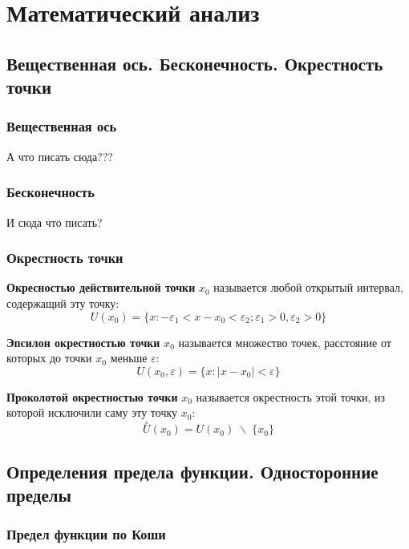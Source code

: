 \documentclass[a4paper,12pt]{extbook}
\theoremstyle{numbered}
\theoremstyle{named}
\theoremstyle{named}
\theoremstyle{named}
\begin{document}
\chapter{Математический анализ}

\section{Вещественная ось. Бесконечность. Окрестность точки}%
\label{sec:Вещественная ось. Бесконечность. Окрестность точки}

\subsection*{Вещественная ось}%
\label{sub:Вещественная ось}
А что писать сюда???

\subsection*{Бесконечность}%
\label{sub:Бесконечность}
И сюда что писать?

\subsection*{Окрестность точки}%
\label{sub:Окрестность точки}

\textbf{Окресностью действительной точки} \(x_0\) называется любой открытый интервал, содержащий эту точку:
\[
    U(x_0) = \{x: -\varepsilon_1 < x - x_0 < \varepsilon_2; \varepsilon_1 > 0, \varepsilon_2 > 0\}
\]

\textbf{Эпсилон окрестностью точки} \(x_0\) называется множество точек, расстояние от которых до точки \(x_0\) меньше \(\varepsilon\):
\[
    U(x_0, \varepsilon) = \{x: |x - x_0| < \varepsilon\}
\]

\textbf{Проколотой окрестностью точки} \(x_0\) называется окрестность этой точки, из которой исключили саму эту точку \(x_0\):
\[
    \overset{\circ}{U}(x_0) = U(x_0) \; \backslash \; \{x_0\}
\]

\section{Определения предела функции. Односторонние пределы}%
\label{sec:Определения предела функции. Односторонние пределы}

\subsection*{Предел функции по Коши}%
\label{sub:Предел функции по Коши}
\end{document}

